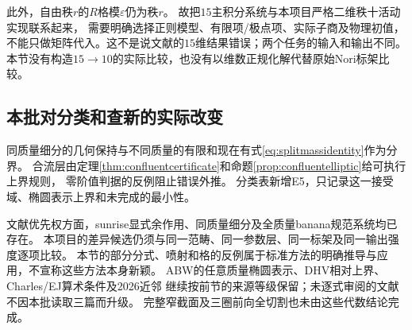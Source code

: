 \documentclass[11pt,a4paper]{ctexart}
\theoremstyle{cnplain}\newtheorem{theorem}{定理}[section]
\theoremstyle{definition}\newtheorem{definition}[theorem]{定义}
\theoremstyle{remark}\newtheorem{remark}[theorem]{注}
\begin{document}
此外，自由秩$r$的$R$格模$\varepsilon$仍为秩$r$。
故把$15$主积分系统与本项目严格二维秩十活动实现联系起来，
需要明确选择正则模型、有限项/极点项、实际子商及物理初值，
不能只做矩阵代入。这不是说文献的$15$维结果错误；两个任务的输入和输出不同。
本节没有构造$15\to10$的实际比较，也没有以维数正规化解代替原始Nori标架比较。

\subsection{本批对分类和查新的实际改变}
同质量细分的几何保持与不同质量的有限和现在有式\eqref{eq:splitmassidentity}作为分界。
合流层由定理\ref{thm:confluentcertificate}和命题\ref{prop:confluentelliptic}给可执行上界规则，
零阶值判据的反例阻止错误外推。
分类表新增E5，只记录这一接受域、椭圆表示上界和未完成的最小性。

文献优先权方面，sunrise显式余作用、同质量细分及全质量banana规范系统均已存在。
本项目的差异候选仍须与同一范畴、同一参数层、同一标架及同一输出强度逐项比较。
本节的部分分式、喷射和格的反例属于标准方法的明确推导与应用，不宣称这些方法本身新颖。
ABW的任意质量椭圆表示、DHV相对上界、Charles/EJ算术条件及2026近邻
继续按前节的来源等级保留；未逐式审阅的文献不因本批读取三篇而升级。
完整窄截面及三圈前向全切割也未由这些代数结论完成。
\end{document}
